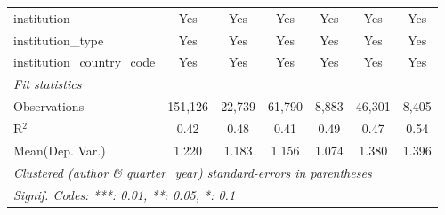 \begin{tabular}{lcccccc}
   institution                  & Yes           & Yes           & Yes           & Yes          & Yes           & Yes\\  
   institution\_type            & Yes           & Yes           & Yes           & Yes          & Yes           & Yes\\  
   institution\_country\_code   & Yes           & Yes           & Yes           & Yes          & Yes           & Yes\\  
   \midrule
   \emph{Fit statistics}\\
   Observations                 & 151,126       & 22,739        & 61,790        & 8,883        & 46,301        & 8,405\\  
   R$^2$                        & 0.42          & 0.48          & 0.41          & 0.49         & 0.47          & 0.54\\  
Mean(Dep. Var.) & 1.220 & 1.183 & 1.156 & 1.074 & 1.380 & 1.396 \\
   \midrule \midrule
   \multicolumn{7}{l}{\emph{Clustered (author \& quarter\_year) standard-errors in parentheses}}\\
   \multicolumn{7}{l}{\emph{Signif. Codes: ***: 0.01, **: 0.05, *: 0.1}}\\
\end{tabular}
\par\endgroup

